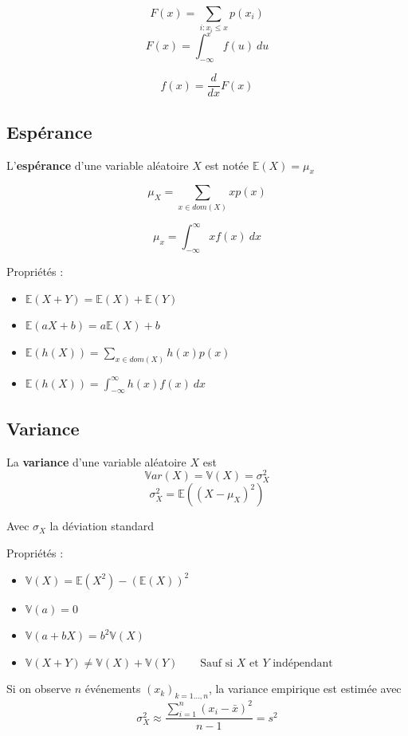 \documentclass[12pt,a4paper]{article}
\begin{document}
$$F(x) = \sum_{i: x_i \leq x} p(x_i)$$
$$F(x) = \int_{-\infty}^x f(u) \: du$$

$$f(x) = \frac{d}{dx} F(x)$$


\subsection{Espérance}

L'\textbf{espérance} d'une variable aléatoire $X$ est notée $\mathbb{E}(X) = \mu_x$

$$\mu_X = \sum_{x\in dom(X)} x p(x)$$

$$\mu_x = \int_{-\infty}^\infty xf(x) \: dx$$

Propriétés :

\begin{itemize}
    \item $\mathbb{E}(X + Y) = \mathbb{E}(X) + \mathbb{E}(Y)$
    \item $\mathbb{E}(aX+b) = a\mathbb{E}(X) + b$
    \item $\mathbb{E}(h(X)) = \sum_{x\in dom(X)} h(x)p(x)$
    \item $\mathbb{E}(h(X)) = \int_{-\infty}^\infty h(x) f(x) \: dx$
\end{itemize}


\subsection{Variance}

La \textbf{variance} d'une variable aléatoire $X$ est
$$\mathbb{V}ar(X) = \mathbb{V}(X) = \sigma_X^2$$
$$\sigma_X^2 = \mathbb{E}\left((X-\mu_X)^2\right)$$

Avec $\sigma_X$ la déviation standard

Propriétés :

\begin{itemize}
    \item $\mathbb{V}(X) = \mathbb{E}(X^2) - (\mathbb{E}(X))^2$
    \item $\mathbb{V}(a) = 0$
    \item $\mathbb{V}(a + bX) = b^2\mathbb{V}(X)$
    \item $\mathbb{V}(X + Y) \neq \mathbb{V}(X) + \mathbb{V}(Y) \qquad \text{Sauf si $X$ et $Y$ indépendant}$
\end{itemize}

\medskip

Si on observe $n$ événements $(x_k)_{k=1\dots,n}$, la variance empirique est estimée avec
$$\sigma_X^2 \approx \frac{\sum_{i=1}^n (x_i - \bar{x})^2}{n-1} = s^2$$
\end{document}

